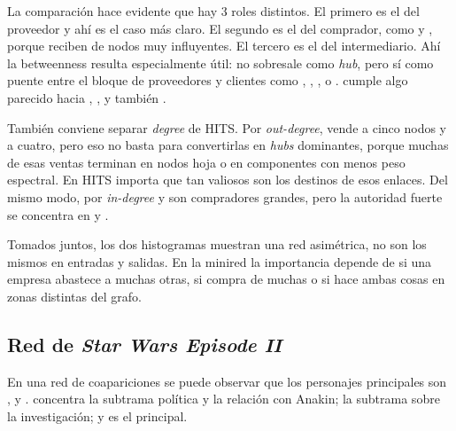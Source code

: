 

La comparaci\'on hace evidente que hay 3 roles distintos. El primero es el del proveedor y ah\'i  es el caso m\'as claro. El segundo es el del comprador, como  y , porque reciben de nodos muy influyentes. El tercero es el del intermediario. Ah\'i la betweenness resulta especialmente \'util:  no sobresale como \textit{hub}, pero s\'i como puente entre el bloque de proveedores y clientes como , , ,  o .  cumple algo parecido hacia , ,  y tambi\'en . 

Tambi\'en conviene separar \textit{degree} de HITS. Por \textit{out-degree},  vende a cinco nodos y  a cuatro, pero eso no basta para convertirlas en \textit{hubs} dominantes, porque muchas de esas ventas terminan en nodos hoja o en componentes con menos peso espectral. En HITS importa que tan valiosos son los destinos de esos enlaces. Del mismo modo, por \textit{in-degree}  y  son compradores grandes, pero la autoridad fuerte se concentra en  y . 

Tomados juntos, los dos histogramas muestran una red asim\'etrica, no son los mismos en entradas y salidas. En la minired la importancia depende de si una empresa abastece a muchas otras, si compra de muchas o si hace ambas cosas en zonas distintas del grafo. 

\subsection{Red de \textit{Star Wars Episode II}}

En una red de coapariciones se puede observar que los personajes principales son ,  y .  concentra la subtrama pol\'itica y la relaci\'on con Anakin;  la subtrama sobre la investigaci\'on; y  es el principal.


